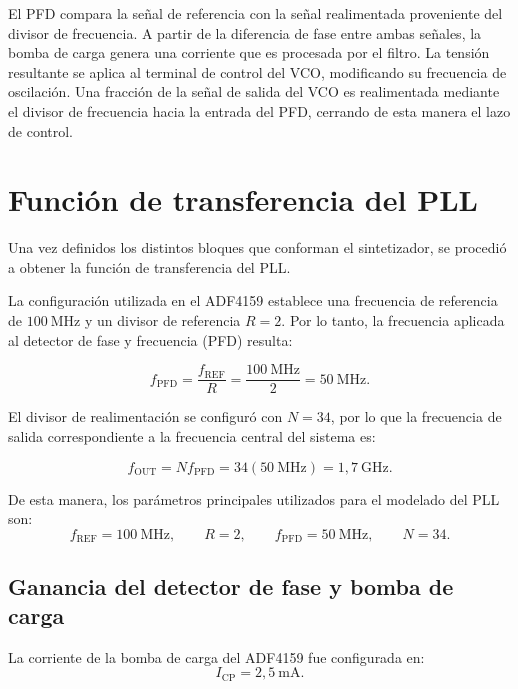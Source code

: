 El PFD compara la señal de referencia con la señal realimentada proveniente del divisor de frecuencia. A partir de la diferencia de fase entre ambas señales, la bomba de carga genera una corriente que es procesada por el filtro. La tensión resultante se aplica al terminal de control del VCO, modificando su frecuencia de oscilación. Una fracción de la señal de salida del VCO es realimentada mediante el divisor de frecuencia hacia la entrada del PFD, cerrando de esta manera el lazo de control.

\section{Función de transferencia del PLL}
Una vez definidos los distintos bloques que conforman el sintetizador, se procedió a obtener la función de transferencia del PLL.

La configuración utilizada en el ADF4159 establece una frecuencia de referencia de $100~\mathrm{MHz}$ y un divisor de referencia $R=2$. Por lo tanto, la frecuencia aplicada al detector de fase y frecuencia (PFD) resulta:

\begin{equation}
f_{\mathrm{PFD}} = \frac{f_{\mathrm{REF}}}{R} = \frac{100~\mathrm{MHz}}{2} = 50~\mathrm{MHz}.
\end{equation}

El divisor de realimentación se configuró con $N=34$, por lo que la frecuencia de salida correspondiente a la frecuencia central del sistema es:

\begin{equation}
f_{\mathrm{OUT}} = N f_{\mathrm{PFD}} = 34(50~\mathrm{MHz}) = 1{,}7~\mathrm{GHz}.
\end{equation}

De esta manera, los parámetros principales utilizados para el modelado del PLL son:
\begin{equation}
f_{\mathrm{REF}} = 100~\mathrm{MHz},
\qquad
R = 2,
\qquad
f_{\mathrm{PFD}} = 50~\mathrm{MHz},
\qquad
N = 34.
\end{equation}

\subsection*{Ganancia del detector de fase y bomba de carga}
La corriente de la bomba de carga del ADF4159 fue configurada en:
\begin{equation}
I_{\mathrm{CP}} = 2{,}5~\mathrm{mA}.
\end{equation}

